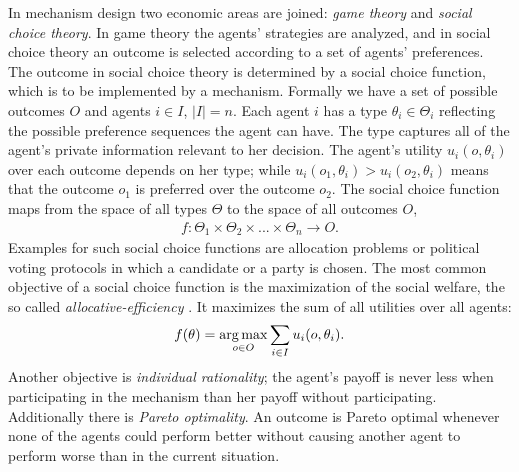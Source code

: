 In mechanism design two economic areas are joined: \emph{game
theory} and \emph{social choice theory}. In game theory the
agents' strategies are analyzed, and in social choice theory an
outcome is selected according to a set of agents' preferences. The
outcome in social choice theory is determined by a social choice
function, which is to be implemented by a mechanism. Formally we
have a set of possible outcomes $O$ and agents $i \in I$, $|I|=n$.
Each agent $i$ has a type $\theta_i \in \Theta_i$ reflecting the
possible preference sequences the agent can have. The type captures
all of the agent's private information relevant to her decision.
The agent's utility $u_i(o,\theta_i)$ over each outcome depends on
her type; while $u_i(o_1,\theta_i)>u_i(o_2,\theta_i)$ means that
the outcome $o_1$ is preferred over the outcome $o_2$. The social
choice function maps from the space of all types $\Theta$ to the
space of all outcomes $O$,
\begin{eqnarray}
  f:\Theta_1 \times\Theta_2\times...\times\Theta_n\rightarrow O.
\end{eqnarray}
Examples for such social choice functions are allocation problems or political voting
protocols in which a candidate or a party is chosen. The most common objective of a social choice function is
the maximization of the social welfare, the so called
\emph{allocative-efficiency} \parencite{Bastian.2011}. It maximizes the sum of
all utilities over all agents:
\begin{eqnarray}
\label{Efficient}
  f(\theta)=\operatorname*{arg\,max}_{o \in O} \sum_{i \in I} u_i(o,\theta_i).
\end{eqnarray}
Another objective is \emph{individual rationality}; the agent's
payoff is never less when participating in the mechanism than her
payoff without participating. Additionally there is \emph{Pareto
optimality}. An outcome is Pareto optimal whenever none of the
agents could perform better without causing another agent to
perform worse than in the current situation.

